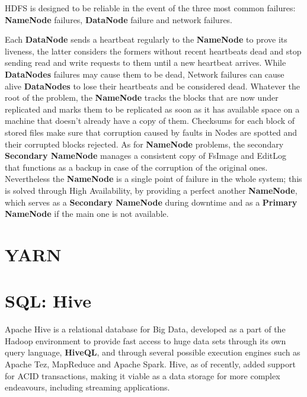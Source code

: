 HDFS is designed to be reliable in the event of the three most common failures: \textbf{NameNode} failures, \textbf{DataNode} failure and network failures.

Each \textbf{DataNode} sends a heartbeat regularly to the \textbf{NameNode} to prove its liveness, the latter considers the formers without recent heartbeats dead and stop sending read and write requests to them until a new heartbeat arrives.\newline
While \textbf{DataNodes} failures may cause them to be dead, Network failures can cause alive \textbf{DataNodes} to lose their heartbeats and be considered dead.\newline
Whatever the root of the problem, the \textbf{NameNode} tracks the blocks that are now under replicated and marks them to be replicated as soon as it has available space on a machine that doesn't already have a copy of them.\newline
Checksums for each block of stored files make sure that corruption caused by faults in Nodes are spotted and their corrupted blocks rejected.\newline
As for \textbf{NameNode} problems, the secondary \textbf{Secondary NameNode} manages a consistent copy of FsImage and EditLog that functions as a backup in case of the corruption of the original ones. Nevertheless the \textbf{NameNode} is a single point of failure in the whole system; this is solved through High Availability, by providing a perfect another \textbf{NameNode}, which serves as a \textbf{Secondary NameNode} during downtime and as a \textbf{Primary NameNode} if the main one is not available.

\section{YARN}

\section{SQL: Hive}

Apache Hive is a relational database for Big Data, developed as a part of the Hadoop environment to provide fast access to huge data sets through its own query language, \textbf{HiveQL}, and through several possible execution engines such as Apache Tez, MapReduce and Apache Spark. Hive, as of recently, added  support for ACID transactions, making it viable as a data storage for more complex endeavours, including streaming applications.

